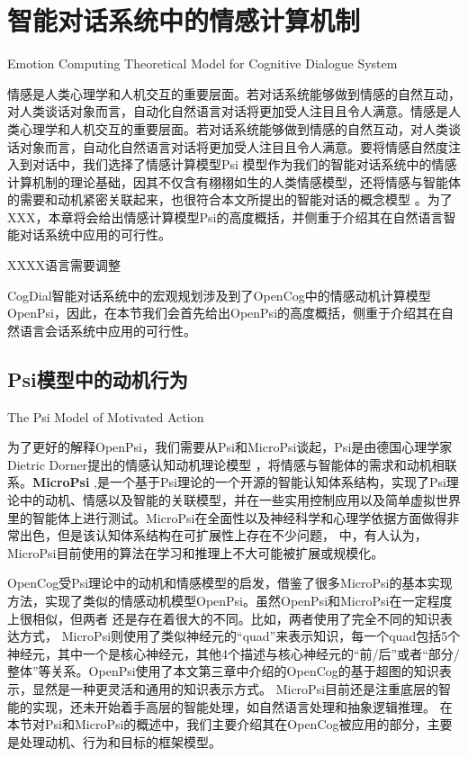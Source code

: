 \chapter{智能对话系统中的情感计算机制}{Emotion Computing Theoretical Model for Cognitive Dialogue System }
\label{chap:psi}


情感是人类心理学和人机交互的重要层面。若对话系统能够做到情感的自然互动，对人类谈话对象而言，自动化自然语言对话将更加受人注目且令人满意。情感是人类心理学和人机交互的重要层面。若对话系统能够做到情感的自然互动，对人类谈话对象而言，自动化自然语言对话将更加受人注目且令人满意。要将情感自然度注入到对话中，我们选择了情感计算模型Psi 模型作为我们的智能对话系统中的情感计算机制的理论基础，因其不仅含有栩栩如生的人类情感模型，还将情感与智能体的需要和动机紧密关联起来，也很符合本文所提出的智能对话的概念模型 。为了XXX，本章将会给出情感计算模型Psi的高度概括，并侧重于介绍其在自然语言智能对话系统中应用的可行性。

XXXX语言需要调整



      CogDial智能对话系统中的宏观规划涉及到了OpenCog中的情感动机计算模型OpenPsi，因此，在本节我们会首先给出OpenPsi的高度概括，侧重于介绍其在自然语言会话系统中应用的可行性。

\section{Psi模型中的动机行为}{The Psi Model of Motivated Action}

       为了更好的解释OpenPsi，我们需要从Psi和MicroPsi谈起，Psi是由德国心理学家Dietric Dorner提出的情感认知动机理论模型 \cite{Dorner2002}，将情感与智能体的需求和动机相联系。{\bf MicroPsi} \cite{Bach2009},是一个基于Psi理论的一个开源的智能认知体系结构，实现了Psi理论中的动机、情感以及智能的关联模型，并在一些实用控制应用以及简单虚拟世界里的智能体上进行测试。MicroPsi在全面性以及神经科学和心理学依据方面做得非常出色，但是该认知体系结构在可扩展性上存在不少问题， \cite{EGI1}中，有人认为，MicroPsi目前使用的算法在学习和推理上不大可能被扩展或规模化。

       OpenCog受Psi理论中的动机和情感模型的启发，借鉴了很多MicroPsi的基本实现方法，实现了类似的情感动机模型OpenPsi。虽然OpenPsi和MicroPsi在一定程度上很相似，但两者 还是存在着很大的不同。比如，两者使用了完全不同的知识表达方式， MicroPsi则使用了类似神经元的“quad”来表示知识，每一个quad包括5个神经元，其中一个是核心神经元，其他4个描述与核心神经元的“前/后”或者“部分/整体”等关系。OpenPsi使用了本文第三章中介绍的OpenCog的基于超图的知识表示，显然是一种更灵活和通用的知识表示方式。 MicroPsi目前还是注重底层的智能的实现，还未开始着手高层的智能处理，如自然语言处理和抽象逻辑推理。
在本节对Psi和MicroPsi的概述中，我们主要介绍其在OpenCog被应用的部分，主要是处理动机、行为和目标的框架模型。

